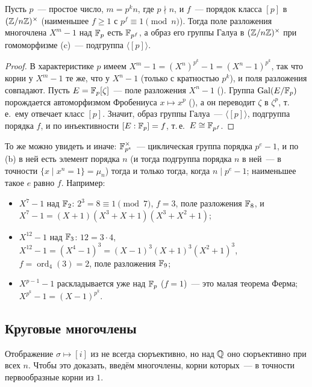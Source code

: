 \begin{proposition}
Пусть $p$~--- простое число, $m=p^kn$, где $p\nmid n$, и $f$~--- порядок класса $[p]$ в $(\mathbb Z/n\mathbb Z)^\times$ (наименьшее $f\ge1$
с $p^f\equiv1\pmod n$). Тогда поле разложения многочлена $X^m-1$ над $\mathbb F_p$ есть $\mathbb F_{p^f}$, а образ его группы Галуа в
$(\mathbb Z/n\mathbb Z)^\times$ при гомоморфизме (c)~--- подгруппа $\langle[p]\rangle$.
\end{proposition}

\begin{proof}
В характеристике $p$ имеем $X^m-1=(X^n)^{p^k}-1=(X^n-1)^{p^k}$, так что корни у $X^m-1$ те же, что у $X^n-1$ (только
с кратностью $p^k$), и поля разложения совпадают. Пусть $E=\mathbb F_p[\zeta]$~--- поле разложения $X^n-1$ (). Группа
$\operatorname{Gal}(E/\mathbb F_p)$ порождается автоморфизмом Фробениуса $x\mapsto x^p$ (), а он переводит $\zeta$ в $\zeta^p$, т.\,е.\
ему отвечает класс $[p]$. Значит, образ группы Галуа~--- $\langle[p]\rangle$, подгруппа порядка $f$, и по инъективности
$[E:\mathbb F_p]=f$, т.\,е.\ $E\cong\mathbb F_{p^f}$.
\end{proof}

То же можно увидеть и иначе: $\mathbb F_{p^e}^\times$~--- циклическая группа порядка $p^e-1$, и по (b) в ней есть элемент
порядка $n$ (и тогда подгруппа порядка $n$ в ней~--- в точности $\{x\mid x^n=1\}=\mu_n$) тогда и только тогда, когда
$n\mid p^e-1$; наименьшее такое $e$ равно $f$. Например:
\begin{itemize}[leftmargin=*]
\item $X^7-1$ над $\mathbb F_2$: $2^3=8\equiv1\pmod7$, $f=3$, поле разложения $\mathbb F_8$, и $X^7-1=(X+1)(X^3+X+1)(X^3+X^2+1)$;
\item $X^{12}-1$ над $\mathbb F_3$: $12=3\cdot4$, $X^{12}-1=(X^4-1)^3=(X-1)^3(X+1)^3(X^2+1)^3$, $f=\operatorname{ord}_4(3)=2$, поле
разложения $\mathbb F_9$;
\item $X^{p-1}-1$ раскладывается уже над $\mathbb F_p$ ($f=1$)~--- это малая теорема Ферма; $X^{p^k}-1=(X-1)^{p^k}$.
\end{itemize}

\subsection*{Круговые многочлены}

Отображение $\sigma\mapsto[i]$ из  не всегда сюръективно, но над $\mathbb Q$ оно сюръективно при всех $n$. Чтобы это
доказать, введём многочлены, корни которых~--- в точности первообразные корни из $1$.


